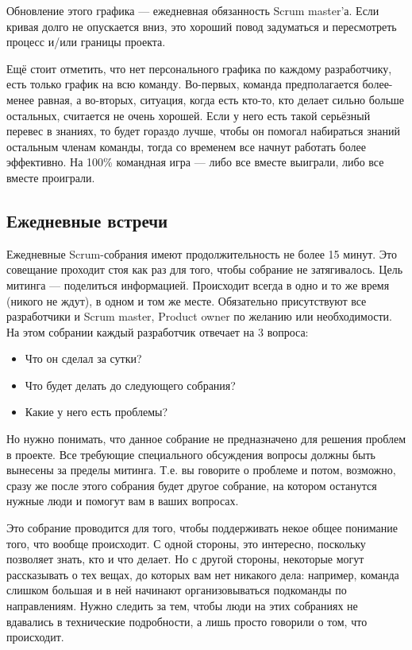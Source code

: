 \documentclass{../../text-style}
\begin{document}
Обновление этого графика --- ежедневная обязанность Scrum master’а. Если кривая долго не опускается вниз, это хороший повод задуматься и пересмотреть процесс и/или границы проекта.

Ещё стоит отметить, что нет персонального графика по каждому разработчику, есть только график на всю команду. Во-первых, команда предполагается более-менее равная, а во-вторых, ситуация, когда есть кто-то, кто делает сильно больше остальных, считается не очень хорошей. Если у него есть такой серьёзный перевес в знаниях, то будет гораздо лучше, чтобы он помогал набираться знаний остальным членам команды, тогда со временем все начнут работать более эффективно. На 100\% командная игра --- либо все вместе выиграли, либо все вместе проиграли.

\subsection{Ежедневные встречи}

Ежедневные Scrum-собрания имеют продолжительность не более 15 минут. Это совещание проходит стоя как раз для того, чтобы собрание не затягивалось. Цель митинга --- поделиться информацией. Происходит всегда в одно и то же время (никого не ждут), в одном и том же месте. Обязательно присутствуют все разработчики и Scrum master, Product owner по желанию или необходимости. На этом собрании каждый разработчик отвечает на 3 вопроса:

\begin{itemize}
    \item Что он сделал за сутки? 
    \item Что будет делать до следующего собрания?
    \item Какие у него есть проблемы? 
\end{itemize}

Но нужно понимать, что данное собрание не предназначено для решения проблем в проекте. Все требующие специального обсуждения вопросы должны быть вынесены за пределы митинга. Т.е. вы говорите о проблеме и потом, возможно, сразу же после этого собрания будет другое собрание, на котором останутся нужные люди и помогут вам в ваших вопросах.

Это собрание проводится для того, чтобы поддерживать некое общее понимание того, что вообще происходит. С одной стороны, это интересно, поскольку позволяет знать, кто и что делает. Но с другой стороны, некоторые могут рассказывать о тех вещах, до которых вам нет никакого дела: например, команда слишком большая и в ней начинают организовываться подкоманды по направлениям. Нужно следить за тем, чтобы люди на этих собраниях не вдавались в технические подробности, а лишь просто говорили о том, что происходит.
\end{document}
